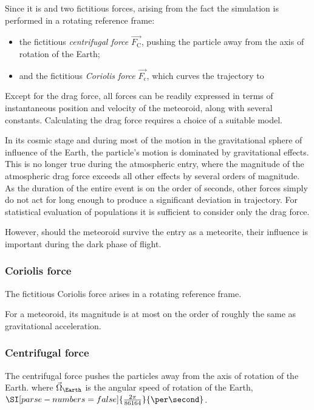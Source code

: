         Since it is 
        and two fictitious forces, arising from the fact the simulation is performed in a rotating reference frame:
        \begin{itemize}
            \item the fictitious \emph{centrifugal force} $\vec{F_{\mathrm{C}}}$, pushing the particle away from the axis of rotation of the Earth;
            \item and the fictitious \emph{Coriolis force} $\vec{F_{\mathrm{c}}}$, which curves the trajectory to
        \end{itemize}

        Except for the drag force, all forces can be readily expressed in terms of instantaneous position and velocity of the meteoroid,
        along with several constants.
        Calculating the drag force requires a choice of a suitable model.

        In its cosmic stage and during most of the motion in the gravitational sphere of influence of the Earth,
        the particle's motion is dominated by gravitational effects. This is no longer true during the atmospheric entry,
        where the magnitude of the atmospheric drag force exceeds all other effects by several orders of magnitude.
        As the duration of the entire event is on the order of seconds, other forces simply do not act for long enough
        to produce a significant deviation in trajectory. For statistical evaluation of populations it is sufficient
        to consider only the drag force.

        However, should the meteoroid survive the entry as a meteorite, their influence is important during the dark phase of flight.

        \subsubsection{Coriolis force} \label{aafC}
            The fictitious Coriolis force arises in a rotating reference frame.

            For a meteoroid, its magnitude is at most on the order of
            roughly the same as gravitational acceleration.

        \subsubsection{Centrifugal force} \label{aafc}
            The centrifugal force pushes the particles away from the axis of rotation of the Earth.
            where $\vec{\Omega}_\Earth$ is the angular speed of rotation of the Earth, $\SI[parse-numbers = false]{\frac{2\pi}{86164}}{\per\second}$.

